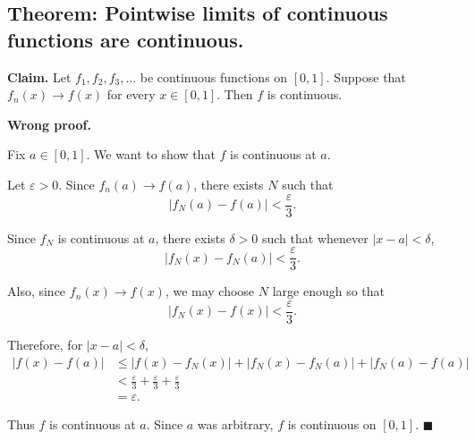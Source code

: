 \documentclass[11pt]{article}
\begin{document}
\subsection{Theorem: Pointwise limits of continuous functions are continuous.}

\textbf{Claim.} Let $f_1,f_2,f_3,\ldots$ be continuous functions on $[0,1]$.
Suppose that $f_n(x)\to f(x)$ for every $x\in[0,1]$. Then $f$ is continuous.

\textbf{Wrong proof.}

Fix $a\in[0,1]$. We want to show that $f$ is continuous at $a$.

Let $\varepsilon>0$. Since $f_n(a)\to f(a)$, there exists $N$ such that
\[
|f_N(a)-f(a)|<\frac{\varepsilon}{3}.
\]

Since $f_N$ is continuous at $a$, there exists $\delta>0$ such that whenever
$|x-a|<\delta$,
\[
|f_N(x)-f_N(a)|<\frac{\varepsilon}{3}.
\]

Also, since $f_n(x)\to f(x)$, we may choose $N$ large enough so that
\[
|f_N(x)-f(x)|<\frac{\varepsilon}{3}.
\]

Therefore, for $|x-a|<\delta$,
\[
\begin{aligned}
|f(x)-f(a)|
&\le |f(x)-f_N(x)|+|f_N(x)-f_N(a)|+|f_N(a)-f(a)| \\
&< \frac{\varepsilon}{3}+\frac{\varepsilon}{3}+\frac{\varepsilon}{3} \\
&=\varepsilon.
\end{aligned}
\]

Thus $f$ is continuous at $a$. Since $a$ was arbitrary, $f$ is continuous on
$[0,1]$. $\blacksquare$





\end{document}
